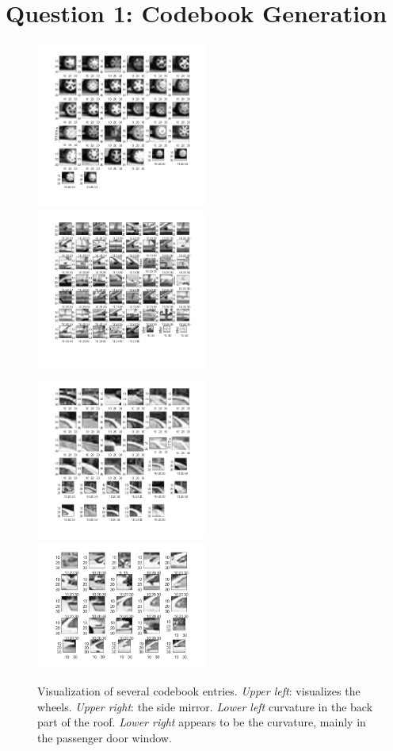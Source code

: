 \documentclass[12pt]{article}
\begin{document}
\section*{Question 1: Codebook Generation}
\begin{figure}[h]
	\includegraphics[width=0.5\textwidth]{features1}
	\includegraphics[width=0.5\textwidth]{features2}
	\includegraphics[width=0.5\textwidth]{features3}
	\includegraphics[width=0.5\textwidth]{features4}
		
	\caption{Visualization of several codebook entries. \textit{Upper left}: visualizes the wheels. \textit{Upper right}: the side mirror. \textit{Lower left} curvature in the back part of the roof. \textit{Lower right} appears to be the curvature, mainly in the passenger door window.  }
\end{figure}
\end{document}
